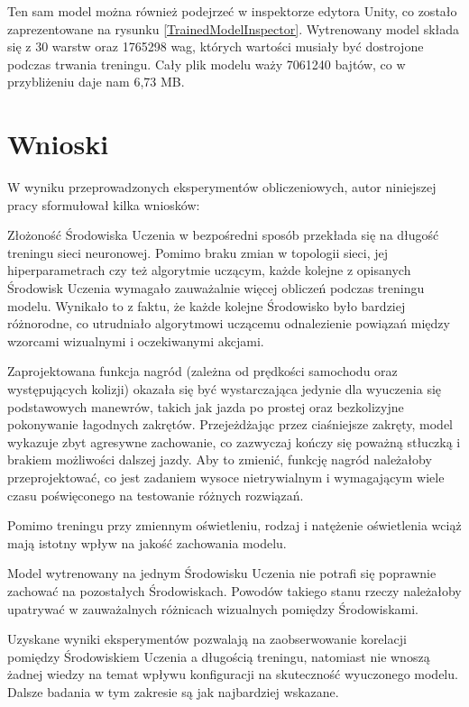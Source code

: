 Ten sam model można również podejrzeć w inspektorze edytora Unity, co zostało zaprezentowane na rysunku \ref{TrainedModelInspector}. Wytrenowany model składa się z 30 warstw oraz 1765298 wag, których wartości musiały być dostrojone podczas trwania treningu. Cały plik modelu waży 7061240 bajtów, co w przybliżeniu daje nam 6,73 MB.

\section{Wnioski}
W wyniku przeprowadzonych eksperymentów obliczeniowych, autor niniejszej pracy sformułował kilka wniosków:

\begin{enumerate*}
\item Złożoność Środowiska Uczenia w bezpośredni sposób przekłada się na długość treningu sieci neuronowej. Pomimo braku zmian w topologii sieci, jej hiperparametrach czy też algorytmie uczącym, każde kolejne z opisanych Środowisk Uczenia wymagało zauważalnie więcej obliczeń podczas treningu modelu. Wynikało to z faktu, że każde kolejne Środowisko było bardziej różnorodne, co utrudniało algorytmowi uczącemu odnalezienie powiązań między wzorcami wizualnymi i oczekiwanymi akcjami.
\item Zaprojektowana funkcja nagród (zależna od prędkości samochodu oraz występujących kolizji) okazała się być wystarczająca jedynie dla wyuczenia się podstawowych manewrów, takich jak jazda po prostej oraz bezkolizyjne pokonywanie łagodnych zakrętów. Przejeżdżając przez ciaśniejsze zakręty, model wykazuje zbyt agresywne zachowanie, co zazwyczaj kończy się poważną stłuczką i brakiem możliwości dalszej jazdy. Aby to zmienić, funkcję nagród należałoby przeprojektować, co jest zadaniem wysoce nietrywialnym i wymagającym wiele czasu poświęconego na testowanie różnych rozwiązań.
\item Pomimo treningu przy zmiennym oświetleniu, rodzaj i natężenie oświetlenia wciąż mają istotny wpływ na jakość zachowania modelu.
\item Model wytrenowany na jednym Środowisku Uczenia nie potrafi się poprawnie zachować na pozostałych Środowiskach. Powodów takiego stanu rzeczy należałoby upatrywać w zauważalnych różnicach wizualnych pomiędzy Środowiskami.
\item Uzyskane wyniki eksperymentów pozwalają na zaobserwowanie korelacji pomiędzy Środowiskiem Uczenia a długością treningu, natomiast nie wnoszą żadnej wiedzy na temat wpływu konfiguracji na skuteczność wyuczonego modelu. Dalsze badania w tym zakresie są jak najbardziej wskazane.
\end{enumerate*}